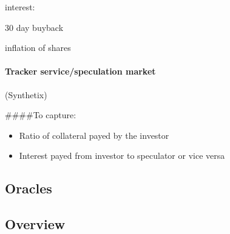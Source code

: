 \documentclass[english,]{IEEEtran}
\providecommand{\tightlist}{%
  \setlength{\itemsep}{0pt}\setlength{\parskip}{0pt}}
\let\oldparagraph\paragraph
\renewcommand{\paragraph}[1]{\oldparagraph{#1}\mbox{}}
\begin{document}
interest:

30 day buyback

inflation of shares

\hypertarget{tracker-servicespeculation-market}{%
\paragraph{Tracker service/speculation
market}\label{tracker-servicespeculation-market}}

(Synthetix)

\#\#\#\#To capture:

\begin{itemize}
\tightlist
\item
  Ratio of collateral payed by the investor
\item
  Interest payed from investor to speculator or vice versa
\end{itemize}

\hypertarget{oracles}{%
\subsection{Oracles}\label{oracles}}

\hypertarget{overview}{%
\subsection{Overview}\label{overview}}
\end{document}
